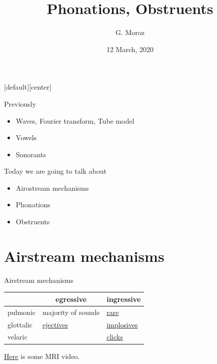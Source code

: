 
[default][center]
\title[]{Phonations, Obstruents}
\author[]{G. Moroz}
\date{12 March, 2020}

\frame{\titlepage}

\begin{frame}{Previously}
\begin{itemize}
\item Waves, Fourier transform, Tube model
\item Vowels
\item Sonorants
\end{itemize}
\pause
Today we are going to talk about
\begin{itemize}
\item Airostream mechanisms
\item Phonations
\item Obstruents
\end{itemize}

\end{frame}

\section{Airstream mechanisms}
\begin{frame}{Airstream mechanisms}
\begin{center}
\begin{tabular}{|l|l|l|}
\hline
 & \multicolumn{1}{c|}{egressive} & \multicolumn{1}{c|}{ingressive} \\ \hline
pulmonic & majority of sounds & \href{http://ingressivespeech.info/}{rare} \\ \hline
glottalic & \href{http://wals.info/feature/7A\#2/13.6/152.9}{ejectives} & \href{http://wals.info/feature/7A\#2/13.6/152.9}{implosives} \\ \hline
velaric &  & \href{https://www.youtube.com/watch?v=31zzMb3U0iY}{clicks}\\ \hline
\end{tabular}
\end{center} 

\href{http://www.seeingspeech.ac.uk/ipachart/display.php?chart=2\&datatype=1\&speaker=1}{Here} is some MRI video.
\end{frame}

